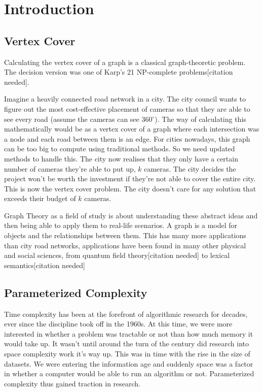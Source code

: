 \section{Introduction}

\subsection{Vertex Cover}

Calculating the vertex cover of a graph is a classical graph-theoretic
problem. The decision version was one of Karp's 21 NP-complete
problems{[}citation needed{]}.

Imagine a heavily connected road network in a city. The city council
wants to figure out the most cost-effective placement of cameras so that
they are able to see every road (assume the cameras can see
360\(^\circ\)). The way of calculating this mathematically would be as a
vertex cover of a graph where each intersection was a node and each road
between them is an edge. For cities nowadays, this graph can be too big
to compute using traditional methods. So we need updated methods to
handle this. The city now realises that they only have a certain number
of cameras they're able to put up, \(k\) cameras. The city decides the
project won't be worth the investment if they're not able to cover the
entire city. This is now the vertex cover problem. The city doesn't care
for any solution that exceeds their budget of \(k\) cameras.

Graph Theory as a field of study is about understanding these abstract
ideas and then being able to apply them to real-life scenarios. A graph
is a model for objects and the relationships between them. This has many
more applications than city road networks, applications have been found
in many other physical and social sciences, from quantum field
theory{[}citation needed{]} to lexical semantics{[}citation needed{]}

\subsection{Parameterized Complexity}

Time complexity has been at the forefront of algorithmic research for
decades, ever since the discipline took off in the 1960s. At this time,
we were more interested in whether a problem was tractable or not than
how much memory it would take up. It wasn't until around the turn of the
century did research into space complexity work it's way up. This was in
time with the rise in the size of datasets. We were entering the
information age and suddenly space was a factor in whether a computer
would be able to run an algorithm or not. Parameterized complexity thus
gained traction in research.

